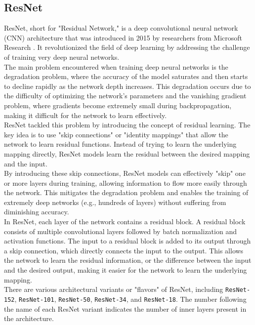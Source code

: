 \newpage

\subsection{ResNet}

ResNet, short for "Residual Network," is a deep convolutional neural network (CNN) architecture that was introduced in 2015 by researchers from Microsoft Research \cite{ResNetPaper}. It revolutionized the field of deep learning by addressing the challenge of training very deep neural networks. \\

The main problem encountered when training deep neural networks is the degradation problem, where the accuracy of the model saturates and then starts to decline rapidly as the network depth increases. This degradation occurs due to the difficulty of optimizing the network's parameters and the vanishing gradient problem, where gradients become extremely small during backpropagation, making it difficult for the network to learn effectively. \\

ResNet tackled this problem by introducing the concept of residual learning. The key idea is to use "skip connections" or "identity mappings" that allow the network to learn residual functions. Instead of trying to learn the underlying mapping directly, ResNet models learn the residual between the desired mapping and the input. \\

By introducing these skip connections, ResNet models can effectively "skip" one or more layers during training, allowing information to flow more easily through the network. This mitigates the degradation problem and enables the training of extremely deep networks (e.g., hundreds of layers) without suffering from diminishing accuracy. \\

In ResNet, each layer of the network contains a residual block. A residual block consists of multiple convolutional layers followed by batch normalization and activation functions. The input to a residual block is added to its output through a skip connection, which directly connects the input to the output. This allows the network to learn the residual information, or the difference between the input and the desired output, making it easier for the network to learn the underlying mapping.  \\

There are various architectural variants or "flavors" of ResNet, including {\tt ResNet-152}, {\tt ResNet-101}, {\tt ResNet-50}, {\tt ResNet-34}, and {\tt ResNet-18}. The number following the name of each ResNet variant indicates the number of inner layers present in the architecture.

